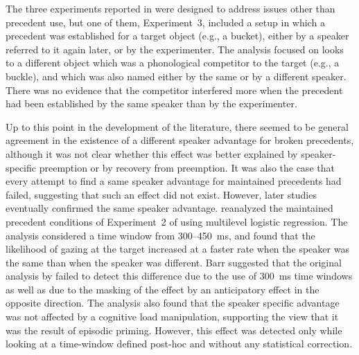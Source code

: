 \documentclass[doc,fignum,apacite,floatsintext]{apa6}
\begin{document}
The three experiments reported in  were designed to address issues other than precedent use, but one of them, Experiment~3, included a setup in which a precedent was established for a target object (e.g., a bucket), either by a speaker referred to it again later, or by the experimenter.  The analysis focused on looks to a different object which was a phonological competitor to the target (e.g., a buckle), and which was also named either by the same or by a different speaker.  There was no evidence that the competitor interfered more when the precedent had been established by the same speaker than by the experimenter.  

Up to this point in the development of the literature, there seemed to be general agreement in the existence of a different speaker advantage for broken precedents, although it was not clear whether this effect was better explained by speaker-specific preemption or by recovery from preemption.  It was also the case that every attempt to find a same speaker advantage for maintained precedents had failed, suggesting that such an effect did not exist.  However, later studies eventually confirmed the same speaker advantage.   reanalyzed the maintained precedent conditions of Experiment~2 of  using multilevel logistic regression.  The analysis considered a time window from 300--450~ms, and found that the likelihood of gazing at the target increased at a faster rate when the speaker was the same than when the speaker was different.  Barr suggested that the original analysis by  failed to detect this difference due to the use of 300~ms time windows as well as due to the masking of the effect by an anticipatory effect in the opposite direction.  The analysis also found that the speaker specific advantage was not affected by a cognitive load manipulation, supporting the view that it was the result of episodic priming.  However, this effect was detected only while looking at a time-window defined post-hoc and without any statistical correction.
\end{document}
